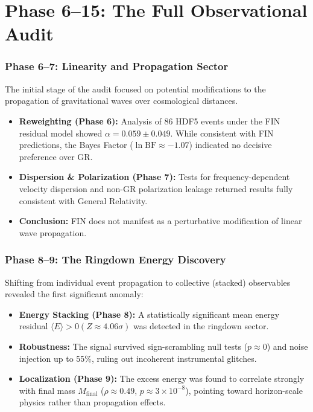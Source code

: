 \documentclass[11pt,a4paper]{book}
\theoremstyle{remark}
\begin{document}
\part{Phase 6--15: The Full Observational Audit}

\section{Phase 6--7: Linearity and Propagation Sector}

The initial stage of the audit focused on potential modifications to the propagation of gravitational waves over cosmological distances.
\begin{itemize}
    \item \textbf{Reweighting (Phase 6):} Analysis of 86 HDF5 events under the FIN residual model showed $\alpha = 0.059 \pm 0.049$. While consistent with FIN predictions, the Bayes Factor ($\ln \text{BF} \approx -1.07$) indicated no decisive preference over GR.
    \item \textbf{Dispersion & Polarization (Phase 7):} Tests for frequency-dependent velocity dispersion and non-GR polarization leakage returned results fully consistent with General Relativity.
    \item \textbf{Conclusion:} FIN does not manifest as a perturbative modification of linear wave propagation.
\end{itemize}

\section{Phase 8--9: The Ringdown Energy Discovery}

Shifting from individual event propagation to collective (stacked) observables revealed the first significant anomaly:
\begin{itemize}
    \item \textbf{Energy Stacking (Phase 8):} A statistically significant mean energy residual $\langle E \rangle > 0 (Z \approx 4.06\sigma)$ was detected in the ringdown sector.
    \item \textbf{Robustness:} The signal survived sign-scrambling null tests ($p \approx 0$) and noise injection up to 55\%, ruling out incoherent instrumental glitches.
    \item \textbf{Localization (Phase 9):} The excess energy was found to correlate strongly with final mass $M_{\text{final}}$ ($\rho \approx 0.49$, $p \approx 3 \times 10^{-8}$), pointing toward horizon-scale physics rather than propagation effects.
\end{itemize}
\end{document}
